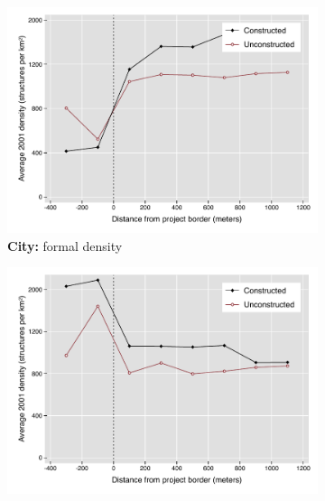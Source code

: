 \documentclass[12pt]{article}
\begin{document}
\begin{figure}[h!]
        \centering
        \caption[ Pre-Period Housing Densities in Constructed and Unconstructed Projects: City versus Suburb]
        {\small Pre-Period Housing Densities in Constructed and Unconstructed Projects: City versus Suburb} 
        \begin{subfigure}[b]{0.495\textwidth}
            \centering
            \includegraphics[width=\textwidth,trim={0.3cm .3cm 0.1cm 0cm}, clip=true]{figures/bblu_for_pre_means_het_near_3.pdf}
            \caption[Network2]%
            {{\small \textbf{City:} formal density}}    
            \label{fig:prefor_near_het}
        \end{subfigure}
        \hfill
        \begin{subfigure}[b]{0.495\textwidth}  
            \centering 
            \includegraphics[width=\textwidth,trim={0.3cm .3cm 0.1cm 0cm}, clip=true]{figures/bblu_inf_pre_means_het_near_3.pdf}

\end{subfigure}
\end{figure}
\end{document}

